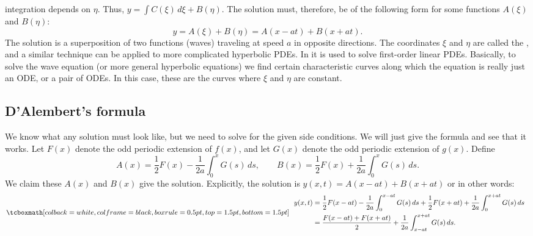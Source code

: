 integration depends on $\eta$.
Thus,
$y = \int C(\xi) \, d\xi + B(\eta)$.
The solution must, therefore, be of the following form for some functions
$A(\xi)$ and $B(\eta)$:
\begin{equation*}
y = A(\xi) + B(\eta) = A(x-at) + B(x+at) .
\end{equation*}
The solution is a superposition of two functions (waves) traveling at speed
$a$
in opposite directions.  The coordinates $\xi$ and $\eta$ are called the
\emph{}, and a similar technique can
be applied to more complicated hyperbolic PDEs.
In  it is used to solve
first-order linear PDEs.
Basically, to solve the wave equation (or more general
hyperbolic equations) we find certain characteristic curves along which
the equation is really just an ODE\@, or a pair of ODEs.  In this case,
these are the curves where $\xi$ and $\eta$ are constant.

\subsection{D'Alembert's formula}

We know what any solution must look like, but we need to solve for the
given side conditions.  We will just give the formula and see that it works.
Let $F(x)$
denote the odd periodic extension of $f(x)$, and let $G(x)$ denote the
odd periodic extension of $g(x)$.  Define
\begin{equation*}
A(x) = \frac{1}{2} F(x) - \frac{1}{2a} \int_0^x G(s) \,ds ,
\qquad
B(x) = \frac{1}{2} F(x) + \frac{1}{2a} \int_0^x G(s) \,ds .
\end{equation*}
We claim these $A(x)$ and $B(x)$ give the solution.  Explicitly, the
solution is $y(x,t) = A(x-at) + B(x+at)$ or in other words:
\begin{equation} \label{dalemb:form}
\mybxbg{~~
\begin{aligned}
y(x,t) & =
\frac{1}{2} F(x-at) - \frac{1}{2a} \int_0^{x-at} G(s) \,ds 
+
\frac{1}{2} F(x+at) + \frac{1}{2a} \int_0^{x+at} G(s) \,ds \\
& =
\frac{F(x-at) + F(x+at)}{2} + \frac{1}{2a} \int_{x-at}^{x+at} G(s) \,ds .
\end{aligned}
~~}
\end{equation}

